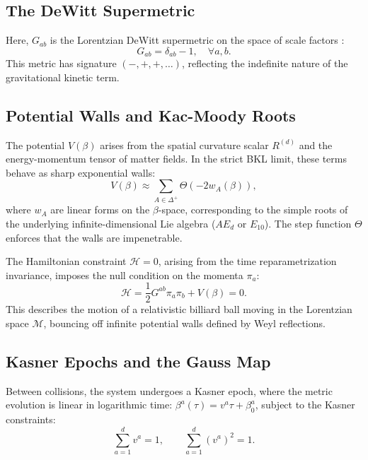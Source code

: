 \documentclass[aps,prd,reprint,nofootinbib,amsmath,amssymb,amsfonts]{revtex4-2}
\begin{document}
\subsection{The DeWitt Supermetric}

Here, $G_{ab}$ is the Lorentzian DeWitt supermetric on the space of scale factors \cite{DeWitt1967}:
\begin{equation}
    G_{ab} = \delta_{ab} - 1, \quad \forall a,b.
\end{equation}
This metric has signature $(-, +, +, \ldots)$, reflecting the indefinite nature of the gravitational kinetic term.

\subsection{Potential Walls and Kac-Moody Roots}

The potential $V(\beta)$ arises from the spatial curvature scalar $R^{(d)}$ and the energy-momentum tensor of matter fields. In the strict BKL limit, these terms behave as sharp exponential walls:
\begin{equation}
    V(\beta) \approx \sum_{A \in \Delta^+} \Theta \left( -2 w_A(\beta) \right),
    \label{eq:potential_walls}
\end{equation}
where $w_A$ are linear forms on the $\beta$-space, corresponding to the simple roots of the underlying infinite-dimensional Lie algebra ($AE_d$ or $E_{10}$). The step function $\Theta$ enforces that the walls are impenetrable.

The Hamiltonian constraint $\mathcal{H} = 0$, arising from the time reparametrization invariance, imposes the null condition on the momenta $\pi_a$:
\begin{equation}
    \mathcal{H} = \frac{1}{2} G^{ab} \pi_a \pi_b + V(\beta) = 0.
    \label{eq:hamiltonian_constraint}
\end{equation}
This describes the motion of a relativistic billiard ball moving in the Lorentzian space $\mathcal{M}$, bouncing off infinite potential walls defined by Weyl reflections.

\subsection{Kasner Epochs and the Gauss Map}

Between collisions, the system undergoes a Kasner epoch, where the metric evolution is linear in logarithmic time: $\beta^a(\tau) = v^a \tau + \beta^a_0$, subject to the Kasner constraints:
\begin{equation}
    \sum_{a=1}^d v^a = 1, \qquad \sum_{a=1}^d (v^a)^2 = 1.
\end{equation}
\end{document}
